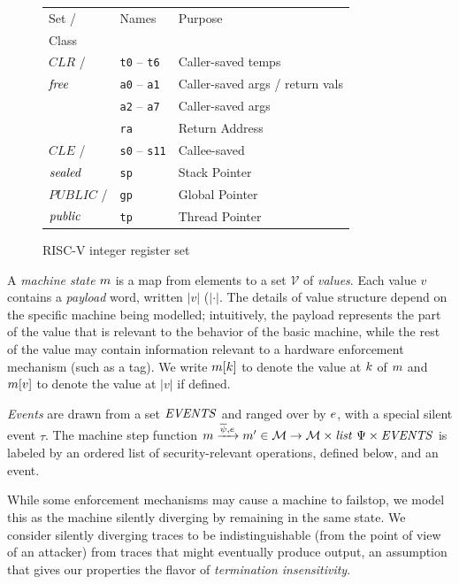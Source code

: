 \documentclass[10pt,conference]{ieeetran}%
\theoremstyle{definition}
\begin{document}
\begin{figure}
  \begin{tabular}{| l | l | l |}
    \hline
    Set / & Names & Purpose \\
    Class & & \\
    \hline
    \(\mathit{CLR}\) / & {\tt t0} -- {\tt t6} & Caller-saved temps \\
    \(\mathit{free}\) & {\tt a0} -- {\tt a1} & Caller-saved args / return vals \\
    & {\tt a2} -- {\tt a7} & Caller-saved args \\
    & {\tt ra} & Return Address \\
    \hline
    \(\mathit{CLE}\) / & {\tt s0} -- {\tt s11} & Callee-saved \\
    \(\mathit{sealed}\) & {\tt sp} & Stack Pointer \\  
    \hline
    \(\mathit{PUBLIC}\) / & {\tt gp} & Global Pointer  \\
    \(\mathit{public}\) & {\tt tp} & Thread Pointer \\
    \hline
  \end{tabular}
  \caption{RISC-V integer register set}
  \label{fig:RISCVregs}
\end{figure}

A {\em machine state} \(m\) is a map from elements to a set \(\mathcal{V}\) of
\emph{values}. Each value \(v\) contains a \emph{payload} word, written \(|v|\) (\(|\cdot|\).
The details of value structure depend on the specific machine being modelled;  
intuitively, the payload represents the part of the value that is relevant to
the behavior of the basic machine, while the rest of the value may contain
information relevant to a hardware enforcement mechanism (such as a tag).
We write \(m[k]\) to denote the value at
\(k\) of \(m\) and \(m[v]\) to denote the value at \(|v|\) if
defined.

{\em Events} are drawn from a set \(\mathit{EVENTS}\) and ranged over by \(e\), with a
special silent event \(\tau\).
The machine step function
\(m \xrightarrow{\overline{\psi},e} m' \in {\mathcal M} \rightarrow
{\mathcal M} \times \mathit{list} ~ \Psi \times \mathit{EVENTS}\)
is labeled by an ordered list of security-relevant operations, defined below,
and an event.

While some enforcement mechanisms may cause a machine to
failstop, we model this as the machine silently diverging by remaining in the
same state. We consider silently diverging traces to be indistinguishable
(from the point of view of an attacker) from traces that might eventually
produce output, an assumption that gives our properties the flavor of
{\it termination insensitivity}.
\end{document}
